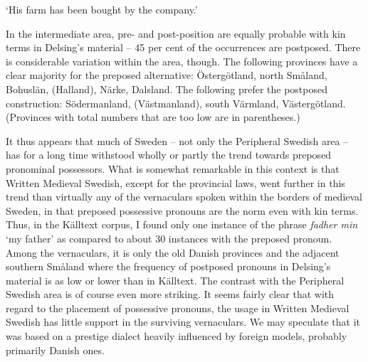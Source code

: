 \begin{styleTranslation}
‘His farm has been bought by the company.’

\end{styleTranslation}

\begin{styleBodyTextFirst}
In the intermediate area, pre- and post-position are equally probable with kin terms in Delsing’s material – 45 per cent of the occurrences are postposed. There is considerable variation within the area, though. The following provinces have a clear majority for the preposed alternative: Östergötland, north Småland, Bohuslän, (Halland), Närke, Dalsland. The following prefer the postposed construction: Södermanland, (Västmanland), south Värmland, Västergötland. (Provinces with total numbers that are too low are in parentheses.)

\end{styleBodyTextFirst}

\begin{styleBodytextC}
It thus appears that much of Sweden – not only the Peripheral Swedish area – has for a long time withstood wholly or partly the trend towards preposed pronominal possessors. What is somewhat remarkable in this context is that Written Medieval Swedish, except for the provincial laws, went further in this trend than virtually any of the vernaculars spoken within the borders of medieval Sweden, in that preposed possessive pronouns are the norm even with kin terms. Thus, in the Källtext corpus, I found only one instance of the phrase \textit{fadher min }‘my father’\textit{ }as compared to about 30 instances with the preposed pronoun. Among the vernaculars, it is only the old Danish provinces and the adjacent southern Småland where the frequency of postposed pronouns in Delsing’s material is as low or lower than in Källtext. The contrast with the Peripheral Swedish area is of course even more striking. It seems fairly clear that with regard to the placement of possessive pronouns, the usage in Written Medieval Swedish has little support in the surviving vernaculars. We may speculate that it was based on a prestige dialect heavily influenced by foreign models, probably primarily Danish ones.

\end{styleBodytextC}

\begin{styleBodytextC}
  [Warning: Image ignored] %
 

\end{styleBodytextC}

